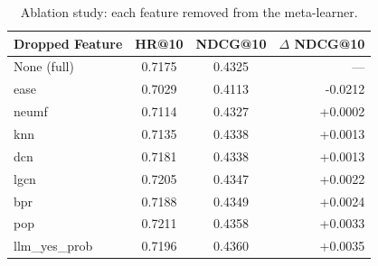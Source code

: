 \begin{table}[t]
\centering
\caption{Ablation study: each feature removed from the meta-learner.}
\label{tab:ablation}
\begin{tabular}{lccr}
\toprule
Dropped Feature & HR@10 & NDCG@10 & $\Delta$ NDCG@10 \\
\midrule
None (full) & 0.7175 & 0.4325 & — \\
\midrule
ease & 0.7029 & 0.4113 & -0.0212 \\
neumf & 0.7114 & 0.4327 & +0.0002 \\
knn & 0.7135 & 0.4338 & +0.0013 \\
dcn & 0.7181 & 0.4338 & +0.0013 \\
lgcn & 0.7205 & 0.4347 & +0.0022 \\
bpr & 0.7188 & 0.4349 & +0.0024 \\
pop & 0.7211 & 0.4358 & +0.0033 \\
llm_yes_prob & 0.7196 & 0.4360 & +0.0035 \\
\bottomrule
\end{tabular}
\end{table}
